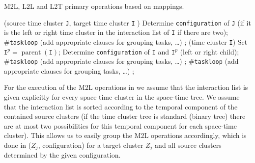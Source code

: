 \documentclass[a4paper,11pt]{article}
\theoremstyle{plain}
\theoremstyle{definition}
\theoremstyle{remark}
\DeclareMathOperator{\parent}{parent}
\begin{document}
\begin{algorithm}
  \caption{M2L, L2L and L2T primary operations based on mappings.} \label{alg:m2l_l2l_l2t_mapping}
  \begin{algorithmic}[1] 
    (source time cluster \texttt{J},
    \FunctionContinue target time cluster \texttt{I} )
      \State Determine \texttt{configuration} of \texttt{J} (if it is the left or right time cluster 
      \Statexindent in the interaction list of \texttt{I} if there are two);
      \State \#\texttt{taskloop} (add appropriate clauses for grouping tasks, \ldots)
        \State {};
      \EndFor
    \EndFunction
    \Statex
    (time cluster \texttt{I})
      \State Set $\texttt{I}^p = \parent(\texttt{I})$;
      \State Determine \texttt{configuration} of $\texttt{I}$ and $\texttt{I}^p$ (left or right child);
      \State \#\texttt{taskloop} (add appropriate clauses for grouping tasks, \ldots)
        \State {};
      \EndFor
    \EndFunction
    \Statex
    \State \#\texttt{taskloop} (add appropriate clauses for grouping tasks, \ldots)
        \State {};
      \EndFor
    \EndFunction
  \end{algorithmic}
\end{algorithm}

For the execution of the M2L operations in  we assume that the interaction list is given explicitly for every space time cluster in the space-time tree. We assume that the interaction list is sorted according to the temporal component of the contained source clusters (if the time cluster tree is standard (binary tree) there are at most two possibilities for this temporal component for each space-time cluster). This allows us to easily group the M2L operations accordingly, which is done in ($Z_j$, configuration) for a target cluster $Z_j$ and all source clusters determined by the given configuration.

\end{document}
